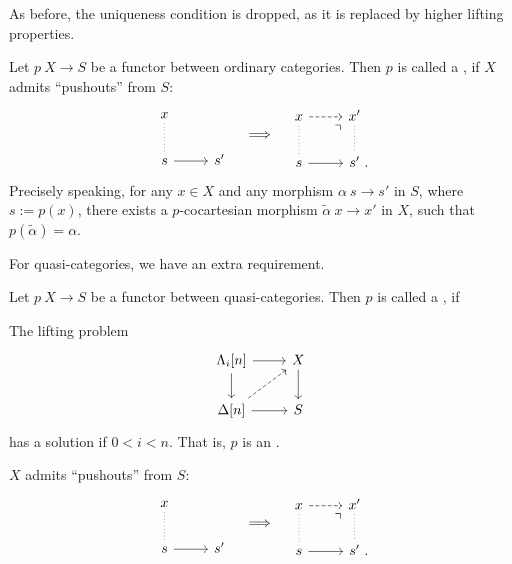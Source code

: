 As before, the uniqueness condition is dropped,
as it is replaced by higher lifting properties.

\begin{definition}
    Let $p\:X\to S$ be a functor between ordinary categories.
    Then $p$ is called a , if $X$ admits ``pushouts'' from $S$:
    \[\begin{tikzcd}
        x\ar[d,dotted,dash] \\
        s \ar[r] & s'
    \end{tikzcd}\quad\Longrightarrow\quad\begin{tikzcd}
        x\ar[r,dashed]\ar[d,dotted,dash] & x'\ar[d,dotted,dash] \\
        s \ar[r]\ar[ur,phantom,end anchor=south west,very near end,"\urcorner"] & s'\rlap{\ .}
    \end{tikzcd}\]
    Precisely speaking, for any
    $x\in X$ and any morphism $\alpha\:s\to s'$ in $S$,
    where $s:=p(x)$,
    there exists a $p$-cocartesian morphism $\tilde\alpha\:x\to x'$ in $X$,
    such that $p(\tilde\alpha)=\alpha$.
\end{definition}

For quasi-categories, we have an extra requirement.

\begin{definition}
    Let $p\:X\to S$ be a functor between quasi-categories.
    Then $p$ is called a , if
    \begin{itms}
        \item The lifting problem 
        \[\begin{tikzcd}
            \Lambda_i[n] \ar[d] \ar[r] & X \ar[d] \\
            \Delta[n] \ar[r] \ar[ur,dashed] & S
        \end{tikzcd}\]
        has a solution if $0<i<n$. That is, $p$ is an .
        \item $X$ admits ``pushouts'' from $S$:
        \[\begin{tikzcd}
            x\ar[d,dotted,dash] \\
            s \ar[r] & s'
        \end{tikzcd}\quad\Longrightarrow\quad\begin{tikzcd}
            x\ar[r,dashed]\ar[d,dotted,dash] & x'\ar[d,dotted,dash] \\
            s \ar[r]\ar[ur,phantom,end anchor=south west,very near end,"\urcorner"] & s'\rlap{\ .}
        \end{tikzcd}\]
    \end{itms}
\end{definition}

